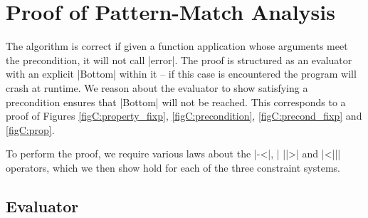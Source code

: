\begin{comment}
-- equality substitution, replacing items
class SubstRep a b c | a c -> b, c b -> a, a b -> c where (/#) :: a -> b -> c
instance SubstRep (Prop (Sat a)) ([a], [b]) (Prop (Sat b))
instance SubstRep VarName ([VarName], [Expr]) Expr

instance Eq Value
instance Eq Expr

alt :: Alt -> Prop (Sat a)
pre' :: String -> [Expr] -> Prop (Sat Expr)
sub :: ([VarName],[Expr])

-- for BP
anys :: String -> Constraint
\end{code}

\h{#mp}\begin{code}
-- for MP
type Constraint = [Val]
data Val = [Pattern] :* [Pattern] | Any
data Pattern = Pattern CtorName [Val]
complete :: CtorName -> Pattern
nonRecs :: CtorName -> [Int]
merge :: [Pattern] -> [Pattern] -> [Pattern]
non :: [Int]
rec :: [Int]
\end{code}
\end{comment}


\chapter{Proof of Pattern-Match Analysis}
\label{chp:proof}


\newcommand{\lemma}[1]{(\textit{#1})}
\newcommand{\theorem}[2]{#2 \hspace{5mm} \lemma{#1} \\}
\newcommand{\proof}[2][]{\paragraph{\lemma{#2} \textsf{#1}}}

The algorithm is correct if given a function application whose arguments meet the precondition, it will not call |error|. The proof is structured as an evaluator with an explicit |Bottom| within it -- if this case is encountered the program will crash at runtime. We reason about the evaluator to show satisfying a precondition ensures that |Bottom| will not be reached. This corresponds to a proof of Figures \ref{figC:property_fixp}, \ref{figC:precondition}, \ref{figC:precond_fixp} and \ref{figC:prop}.

To perform the proof, we require various laws about the |-<|, | ||>| and |<||| operators, which we then show hold for each of the three constraint systems.

\section{Evaluator}

